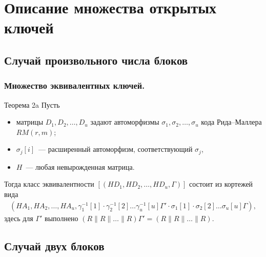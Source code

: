 {%
\section[Описание открытых ключей]{Описание множества открытых ключей}

\subsection[Произвольное число блоков]{Случай произвольного числа блоков}

\begin{frame}
  \frametitle{Множество эквивалентных ключей.}
\begin{block}{Теорема 2a}
Пусть
\begin{itemize}
\item матрицы $D_1,D_2,\ldots, D_u$ задают автоморфизмы $\sigma_1,\sigma_2,\ldots,\sigma_u$ кода Рида--Маллера $RM(r,m)$;
\item $\sigma_j[i]$~--- расширенный автоморфизм, соответствующий $\sigma_j$,
\item $H$~--- любая невырожденная матрица.
\end{itemize}
Тогда класс эквивалентности $[(HD_1,HD_2,\ldots,HD_u,\Gamma)]$ состоит из кортежей вида
\begin{eqnarray*}
(HA_1,HA_2,\ldots,HA_u,\gamma^{-1}_1[1]\cdot\gamma^{-1}_2[2]\ldots
\gamma^{-1}_u[u]\Gamma'
\cdot\sigma_1[1]\cdot\sigma_2[2]\ldots\sigma_u[u]\Gamma),
\end{eqnarray*}
здесь для $\Gamma'$ выполнено $(R\|R\|\ldots\|R)\Gamma'=(R\|R\|\ldots\|R).$
\end{block}
\end{frame}

\subsection[Два блока]{Случай двух блоков}

}
